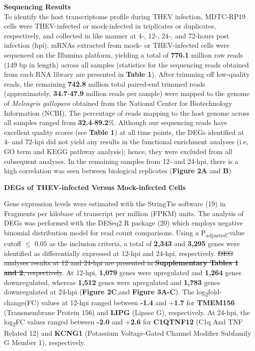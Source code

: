 \documentclass[
]{article}
\begin{document}
\textbf{Sequencing Results}\\
To identify the host transcriptome profile during THEV infection,
MDTC-RP19 cells were THEV-infected or mock-infected in triplicates or
duplicates, respectively, and collected in like manner at 4-, 12-, 24-,
and 72-hours post infection (hpi). mRNAs extracted from mock- or
THEV-infected cells were sequenced on the Illumina platform, yielding a
total of \textbf{776.1} million raw reads (149 bp in length) across all
samples (statistics for the sequencing reads obtained from each RNA
library are presented in \textbf{Table 1}). After trimming off
low-quality reads, the remaining \textbf{742.8} million total paired-end
trimmed reads (approximately, \textbf{34.7}-\textbf{47.9} million reads
per sample) were mapped to the genome of \emph{Meleagris gallopavo}
obtained from the National Center for Biotechnology Information (NCBI).
The percentage of reads mapping to the host genome across all samples
ranged from \textbf{32.4}-\textbf{89.2}\%. Although our sequencing reads
have excellent quality scores (see \textbf{Table 1}) at all time points,
the DEGs identified at 4- and 72-hpi did not yield any results in the
functional enrichment analyses (i.e, GO term and KEGG pathway analysis);
hence, they were excluded from all subsequent analyses. In the remaining
samples from 12- and 24-hpi, there is a high correlation was seen
between biological replicates (\textbf{Figure 2A} and \textbf{B})

\textbf{DEGs of THEV-infected Versus Mock-infected Cells}

Gene expression levels were estimated with the StringTie software (19)
in Fragments per kilobase of transcript per million (FPKM) units. The
analysis of DEGs was performed with the DESeq2 R package (20) which
employs negative binomial distribution model for read count comparisons.
Using a P\textsubscript{adjusted}-value cutoff \(\leq\) 0.05 as the
inclusion criteria, a total of \textbf{2,343} and \textbf{3,295} genes
were identified as differentially expressed at 12-hpi and 24-hpi,
respectively. \st{DEG analyses results at 12 and 24-hpi are presented in
\textbf{Supplementary Tables 1 and 2}, respectively}. At 12-hpi,
\textbf{1,079} genes were upregulated and \textbf{1,264} genes
downregulated, whereas \textbf{1,512} genes were upregulated and
\textbf{1,783} genes downregulated at 24-hpi (\textbf{Figure 2C},and
\textbf{Figure 3A-C}). The log\textsubscript{2}fold-change(FC) values at
12-hpi ranged between \textbf{-1.4} and +\textbf{1.7} for
\textbf{TMEM156} (Transmembrane Protein 156) and \textbf{LIPG} (Lipase
G), respectively. At 24-hpi, the log\textsubscript{2}FC values ranged
between \textbf{-2.0} and +\textbf{2.6} for \textbf{C1QTNF12} (C1q And
TNF Related 12) and \textbf{KCNG1} (Potassium Voltage-Gated Channel
Modifier Subfamily G Member 1), respectively.
\end{document}
